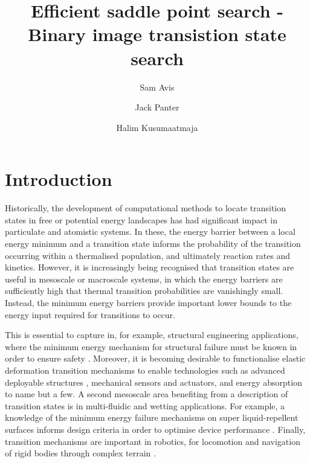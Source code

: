 \documentclass[aps,twocolumn]{revtex4}
\begin{document}
\title{Efficient saddle point search - Binary image transistion state search}
\author{Sam Avis}
\author{Jack Panter}
\author{Halim Kusumaatmaja}

\begin{abstract}
\lipsum[1]
\end{abstract}

\maketitle


\section{Introduction}
Historically, the development of computational methods to locate transition states in free or potential energy landscapes has had significant impact in particulate and atomistic systems. In these, the energy barrier between a local energy minimum and a transition state informs the probability of the transition occurring within a thermalised population, and ultimately reaction rates and kinetics. However, it is increasingly being recognised that transition states are useful in mesoscale or macroscale systems, in which the energy barriers are sufficiently high that thermal transition probabilities are vanishingly small. Instead, the minimum energy barriers provide important lower bounds to the energy input required for transitions to occur.

This is essential to capture in, for example, structural engineering applications, where the minimum energy mechanism for structural failure must be known in order to ensure safety \cite{Panter2019,Hutchinson2018}. Moreover, it is becoming desirable to functionalise elastic deformation transition mechanisms to enable technologies such as advanced deployable structures \cite{Filipov2015,Zhai2018}, mechanical sensors and actuators, and energy absorption \cite{Shan2015} to name but a few. A second mesoscale area benefiting from a description of transition states is in multi-fluidic and wetting applications. For example, a knowledge of the minimum energy failure mechanisms on super liquid-repellent surfaces informs design criteria in order to optimise device performance \cite{Zhang2014,Panter2019b}. Finally, transition mechanisms are important in robotics, for locomotion and navigation of rigid bodies through complex terrain \cite{Othayoth2020}.
\end{document}
